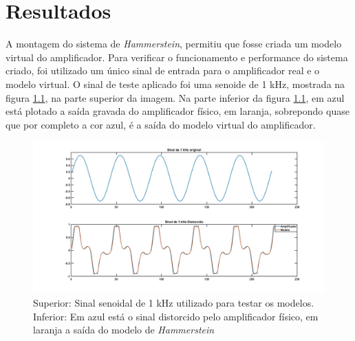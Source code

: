\chapter{Resultados}




A montagem do sistema de \textit{Hammerstein}, permitiu que fosse criada um modelo virtual do amplificador. Para verificar o funcionamento e performance do sistema criado, foi utilizado um único sinal de entrada para o amplificador real e o modelo virtual. O sinal de teste aplicado foi uma senoide de 1 kHz, mostrada na figura \ref{fig:tccfig}, na parte superior da imagem. Na parte inferior da figura \ref{fig:tccfig}, em azul está plotado a saída gravada do amplificador físico, em laranja, sobrepondo quase que por completo a cor azul, é a saída do modelo virtual do amplificador.

\begin{figure}
	\centering
	\includegraphics[width=1\linewidth]{figuras/TCC_fig}
	\caption{Superior: Sinal senoidal de 1 kHz utilizado para testar os modelos. Inferior: Em azul está o sinal distorcido pelo amplificador físico, em laranja a saída do modelo de \textit{Hammerstein}}
	\label{fig:tccfig}
\end{figure}

